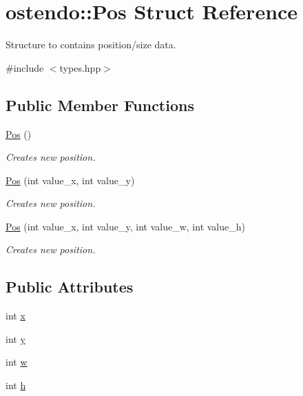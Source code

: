 \hypertarget{structostendo_1_1Pos}{}\section{ostendo\+:\+:Pos Struct Reference}
\label{structostendo_1_1Pos}


Structure to contains position/size data.  




{\ttfamily \#include $<$types.\+hpp$>$}

\subsection*{Public Member Functions}
\begin{DoxyCompactItemize}
\item 
\hyperlink{structostendo_1_1Pos_a6d76a3381e3fa97a8491907f028e9584}{Pos} ()
\begin{DoxyCompactList}\small\item\em Creates new position. \end{DoxyCompactList}\item 
\hyperlink{structostendo_1_1Pos_a2a22e8ea6064992f404769b93f685669}{Pos} (int value\+\_\+x, int value\+\_\+y)
\begin{DoxyCompactList}\small\item\em Creates new position. \end{DoxyCompactList}\item 
\hyperlink{structostendo_1_1Pos_a3401ddc5e051daa5d6e485fc3c12edcf}{Pos} (int value\+\_\+x, int value\+\_\+y, int value\+\_\+w, int value\+\_\+h)
\begin{DoxyCompactList}\small\item\em Creates new position. \end{DoxyCompactList}\end{DoxyCompactItemize}
\subsection*{Public Attributes}
\begin{DoxyCompactItemize}
\item 
int \hyperlink{structostendo_1_1Pos_a123081aea927725b236b54b208b491f7}{x}
\item 
int \hyperlink{structostendo_1_1Pos_a896a4cd18785ab58133d2f1eeea49fab}{y}
\item 
int \hyperlink{structostendo_1_1Pos_ab5fd0f24e24d324fbd2fdab6b474ad6d}{w}
\item 
int \hyperlink{structostendo_1_1Pos_a5767feb86934899b7916e5a0cc5093f0}{h}
\end{DoxyCompactItemize}


